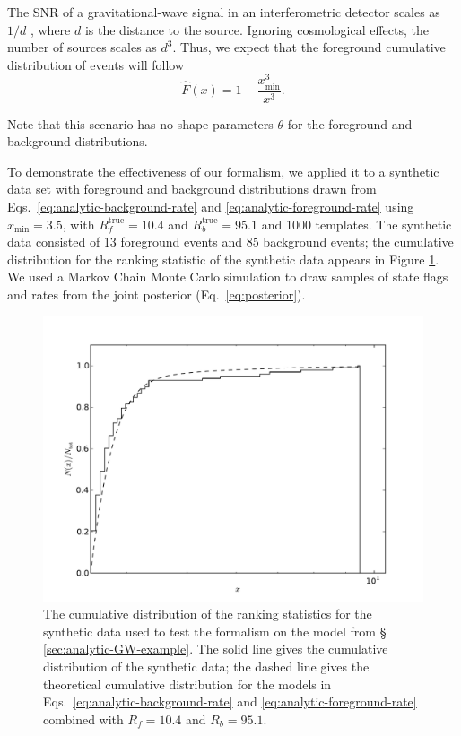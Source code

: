 \documentclass[aps,prd,reprint,nofootinbib]{revtex4-1}
\newcommand{\xmin}{x_\mathrm{min}}
\begin{document}
The SNR of a gravitational-wave signal in an interferometric detector
scales as $1/d$ \citep{Finn1992}, where $d$ is the distance to the
source.  Ignoring cosmological effects, the number of sources scales
as $d^3$.  Thus, we expect that the foreground cumulative distribution
of events will follow
\begin{equation}
  \label{eq:analytic-foreground-rate}
  \hat{F}(x) = 1 - \frac{\xmin^3}{x^3}.
\end{equation}

Note that this scenario has no shape parameters $\theta$ for the
foreground and background distributions.

To demonstrate the effectiveness of our formalism, we applied it to a
synthetic data set with foreground and background distributions drawn
from Eqs.~\eqref{eq:analytic-background-rate} and
\eqref{eq:analytic-foreground-rate} using $x_\mathrm{min} = 3.5$, with
$R_f^\mathrm{true} = 10.4$ and $R_b^\mathrm{true} = 95.1$ and 1000
templates.  The synthetic data consisted of 13 foreground events and
85 background events; the cumulative distribution for the ranking
statistic of the synthetic data appears in Figure
\ref{fig:analytic-data-cumulative}.  We used a Markov Chain Monte
Carlo simulation to draw samples of state flags and rates from the
joint posterior (Eq.~\eqref{eq:posterior}).

\begin{figure}
  \includegraphics[width=\columnwidth]{data}
  \caption{\label{fig:analytic-data-cumulative} The cumulative
    distribution of the ranking statistics for the synthetic data used
    to test the formalism on the model from \S
    \ref{sec:analytic-GW-example}.  The solid line gives the
    cumulative distribution of the synthetic data; the dashed line
    gives the theoretical cumulative distribution for the models in
    Eqs.~\eqref{eq:analytic-background-rate} and
    \eqref{eq:analytic-foreground-rate} combined with $R_f = 10.4$ and
    $R_b = 95.1$.}
\end{figure}
\end{document}
